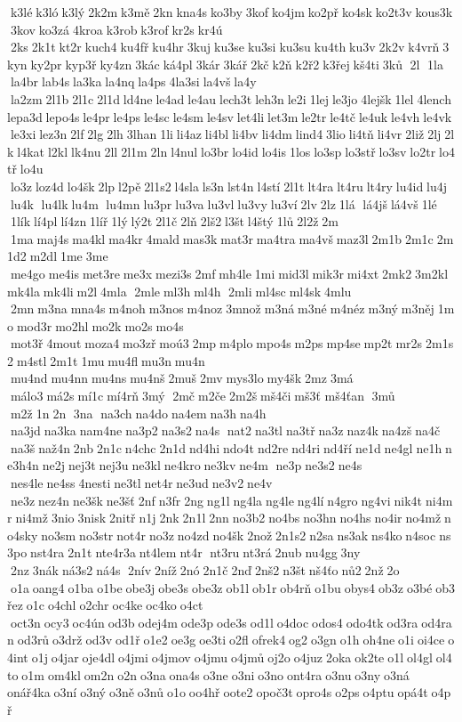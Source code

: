  k3lé k3ló k3lý 2k2m k3mě 2kn kna4s ko3by 3kof ko4jm ko2př ko4sk ko2t3v kous3k 3kov ko3zá 4kroa k3rob k3rof kr2s kr4ú  2ks 2k1t kt2r kuch4 ku4fř ku4hr 3kuj ku3se ku3si ku3su ku4th ku3v 2k2v k4vrň 3kyn ky2pr kyp3ř ky4zn 3kác ká4pl 3kár 3kář 2kč k2ň k2ř2 k3řej kš4ti 3ků  2l  1la  la4br lab4s la3ka la4nq la4ps 4la3si la4vš la4y  la2zm 2l1b 2l1c 2l1d ld4ne le4ad le4au lech3t leh3n le2i 1lej le3jo 4lejšk 1lel 4lench lepa3d lepo4s le4pr le4ps le4sc le4sm le4sv let4li let3m le2tr le4tč le4uk le4vh le4vk le3xi lez3n 2lf 2lg 2lh 3lhan 1li li4az li4bl li4bv li4dm lind4 3lio li4tň li4vr 2liž 2lj 2lk l4kat l2kl lk4nu 2ll 2l1m 2ln l4nul lo3br lo4id lo4is 1los lo3sp lo3stř lo3sv lo2tr lo4tř lo4u  lo3z loz4d lo4šk 2lp l2pě 2l1s2 l4sla ls3n lst4n l4stí 2l1t lt4ra lt4ru lt4ry lu4id lu4j  lu4k  lu4lk lu4m  lu4mn lu3pr lu3va lu3vl lu3vy lu3ví 2lv 2lz 1lá  lá4jš lá4vš 1lé  1lík lí4pl lí4zn 1líř 1lý lý2t 2l1č 2lň 2lš2 l3št l4štý 1lů 2l2ž 2m  1ma maj4s ma4kl ma4kr 4mald mas3k mat3r ma4tra ma4vš maz3l 2m1b 2m1c 2m1d2 m2dl 1me 3me  me4go me4is met3re me3x mezi3s 2mf mh4le 1mi mid3l mik3r mi4xt 2mk2 3m2kl mk4la mk4li m2l 4mla  2mle ml3h ml4h  2mli ml4sc ml4sk 4mlu  2mn m3na mna4s m4noh m3nos m4noz 3množ m3ná m3né m4néz m3ný m3něj 1mo mod3r mo2hl mo2k mo2s mo4s  mot3ř 4mout moza4 mo3zř moú3 2mp m4plo mpo4s m2ps mp4se mp2t mr2s 2m1s2 m4stl 2m1t 1mu mu4fl mu3n mu4n  mu4nd mu4nn mu4ns mu4nš 2muš 2mv mys3lo my4šk 2mz 3má  málo3 má2s mí1c mí4rň 3mý  2mč m2če 2m2š mš4či mš3ť 	mš4ťan  3mů  m2ž 1n 2n  3na  na3ch na4do na4em na3h na4h  na3jd na3ka nam4ne na3p2 na3s2 na4s  nat2 na3tl na3tř na3z naz4k na4zš na4č  na3š naž4n 2nb 2n1c n4chc 2n1d nd4hi ndo4t nd2re nd4ri nd4ří ne1d ne4gl ne1h ne3h4n ne2j nej3t nej3u ne3kl ne4kro ne3kv ne4m  ne3p ne3s2 ne4s  nes4le ne4ss 4nesti ne3tl net4r ne3ud ne3v2 ne4v  ne3z nez4n ne3šk ne3šť 2nf n3fr 2ng ng1l ng4la ng4le ng4lí n4gro ng4vi nik4t ni4mr ni4mž 3nio 3nisk 2nitř n1j 2nk 2n1l 2nn no3b2 no4bs no3hn no4hs no4ir no4mž no4sky no3sm no3str not4r no3z no4zd no4šk 2nož 2n1s2 n2sa ns3ak ns4ko n4soc ns3po nst4ra 2n1t nte4r3a nt4lem nt4r  nt3ru nt3rá 2nub nu4gg 3ny  2nz 3nák ná3s2 ná4s  2nív 2níž 2nó 2n1č 2nď 2nš2 n3št nš4ťo nů2 2nž 2o  o1a oang4 o1ba o1be obe3j obe3s obe3z ob1l ob1r ob4rň o1bu obys4 ob3z o3bé ob3řez o1c o4chl o2chr oc4ke oc4ko o4ct  oct3n ocy3 oc4ún od3b odej4m ode3p ode3s od1l o4doc odos4 odo4tk od3ra od4ran od3rů o3drž od3v od1ř o1e2 oe3g oe3ti o2fl ofrek4 og2 o3gn o1h oh4ne o1i oi4ce o4int o1j o4jar oje4dl o4jmi o4jmov o4jmu o4jmů oj2o o4juz 2oka ok2te o1l ol4gl ol4to o1m om4kl om2n o2n o3na ona4s o3ne o3ni o3no ont4ra o3nu o3ny o3ná 	onář4ka o3ní o3ný o3ně o3nů o1o oo4hř oote2 opoč3t opro4s o2ps o4ptu opá4t o4př 